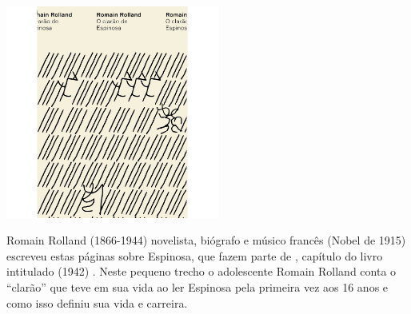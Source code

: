\pagebreak

\hspace{.5cm}

\begin{center}
\hspace*{-.5cm}\includegraphics[width=70mm]{./grid/romain.jpeg}
\end{center}

\hspace*{-7cm}\hrulefill\hspace*{-7cm}

\medskip

\noindent{}Romain Rolland (1866-1944) novelista, biógrafo e músico francês (Nobel de 1915) escreveu estas páginas sobre Espinosa, que fazem parte de {}, capítulo do livro intitulado {} (1942) . Neste pequeno trecho o adolescente Romain Rolland conta o “clarão” que teve em sua vida ao ler Espinosa pela primeira vez aos 16 anos e como isso definiu sua vida e carreira.

\vfill

\hspace*{-.4cm}\begin{minipage}[c]{1\linewidth}
\small{
{}}
\end{minipage}

\pagebreak

\hspace{.5cm}

